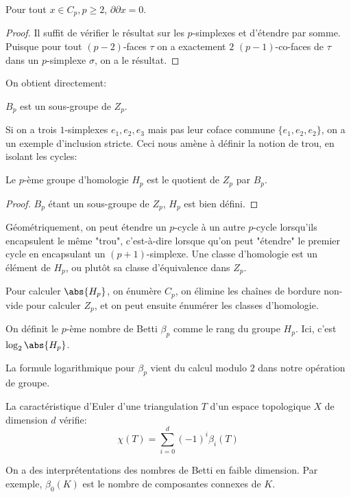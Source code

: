 \begin{lemme}
	Pour tout $x \in C_{p}, p \geq 2$, $\partial \partial x = 0$.
\end{lemme}
\begin{proof}
	Il suffit de vérifier le résultat sur les $p$-simplexes et d'étendre par somme.
	Puisque pour tout $(p-2)$-faces $\tau$ on a exactement $2$ $(p-1)$-co-faces de $\tau$ dans un $p$-simplexe $\sigma$, on a le résultat.
\end{proof}

On obtient directement:
\begin{proposition}
	$B_{p}$ est un sous-groupe de $Z_{p}$.
\end{proposition}
Si on a trois $1$-simplexes $e_{1}, e_{2}, e_{3}$ mais pas leur coface commune $\{e_{1}, e_{2}, e_{2}\}$, on a un exemple d'inclusion stricte.
Ceci nous amène à définir la notion de trou, en isolant les cycles:

\begin{definition}
	Le $p$-ème groupe d'homologie $H_{p}$ est le quotient de $Z_{p}$ par $B_{p}$.
\end{definition}
\begin{proof}
	$B_{p}$ étant un sous-groupe de $Z_{p}$, $H_{p}$ est bien défini.
\end{proof}

Géométriquement, on peut étendre un $p$-cycle à un autre $p$-cycle lorsqu'ils encapsulent le même "trou", c'est-à-dire lorsque qu'on peut "étendre" le premier cycle en encapsulant un $(p + 1)$-simplexe.
Une classe d'homologie est un élément de $H_{p}$, ou plutôt sa classe d'équivalence dans $Z_{p}$.

Pour calculer $\abs{H_{p}}$, on énumère $C_{p}$, on élimine les chaînes de bordure non-vide pour calculer $Z_{p}$, et on peut ensuite énumérer les classes d'homologie.

\begin{definition}
	On définit le $p$-ème nombre de Betti $\beta_{p}$ comme le rang du groupe $H_{p}$. Ici, c'est $\log_{2}\abs{H_{p}}$.
\end{definition}
La formule logarithmique pour $\beta_{p}$ vient du calcul modulo $2$ dans notre opération de groupe.

\begin{proposition}
	La caractéristique d'Euler d'une triangulation $T$ d'un espace topologique $X$ de dimension $d$ vérifie:
	\begin{equation*}
		\chi(T) = \sum_{i = 0}^{d} (-1)^{i}\beta_{i}(T)
	\end{equation*}
\end{proposition}

On a des interprétentations des nombres de Betti en faible dimension.
Par exemple, $\beta_{0}(K)$ est le nombre de composantes connexes de $K$.

